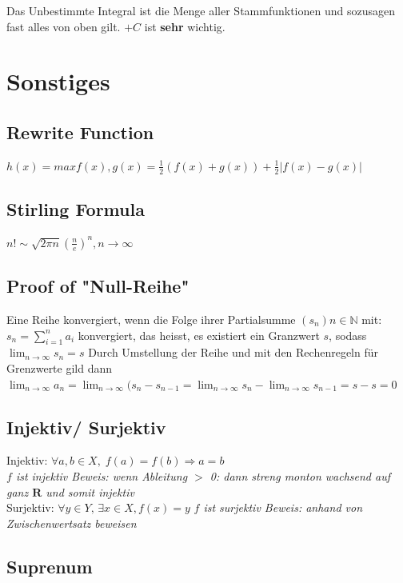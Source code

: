 \documentclass[8pt]{extarticle}
\def\R{\mathbf{R}}
\begin{document}
\begin{multicols*}{3}
Das Unbestimmte Integral ist die Menge aller Stammfunktionen und sozusagen fast alles von oben gilt. $+C$ ist \textbf{sehr} wichtig.
\newpage
\section{Sonstiges}
\subsection{Rewrite Function}
$h(x) = max{f(x), g(x)} = \frac{1}{2}(f(x) + g(x)) + \frac{1}{2}|f(x) -g(x)|$

\subsection{Stirling Formula}
$n! \sim \sqrt{2\pi n}(\frac{n}{e})^n, n \rightarrow \infty$

\subsection{Proof of "Null-Reihe"}
Eine Reihe konvergiert, wenn die Folge ihrer Partialsumme $(s_n) n \in \mathbb{N} $ mit: $s_n = \sum_{i=1}^{n} a_i$ konvergiert, das heisst, es existiert ein Granzwert $s$, sodass
	$\lim_{n \to \infty} s_n = s$  Durch Umstellung der Reihe und mit den Rechenregeln für Grenzwerte gild dann
	$\lim_{n \to \infty} a_n = \lim_{n \to \infty} (s_n - s_{n - 1} = \lim_{n \to \infty} s_n - \lim_{n \to \infty} s_{n-1} =  s - s = 0$

\hypertarget{sec:5}{}

\subsection{Injektiv/ Surjektiv}

Injektiv: $\forall a, b \in X, \;f(a) = f(b) \Rightarrow a = b$\\
\textit{$f$ ist injektiv Beweis: wenn Ableitung $>$ 0: dann streng monton wachsend auf ganz $\R$ und somit injektiv}\\
Surjektiv: $\forall y \in Y, \, \exists x \in X, f(x) = y$
\textit{$f$ ist surjektiv Beweis: anhand von Zwischenwertsatz beweisen}\\

\subsection{Suprenum}


\end{multicols*}
\end{document}
